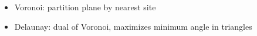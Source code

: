 \begin{itemize}
  \item Voronoi: partition plane by nearest site
  \item Delaunay: dual of Voronoi, maximizes minimum angle in triangles
\end{itemize}
